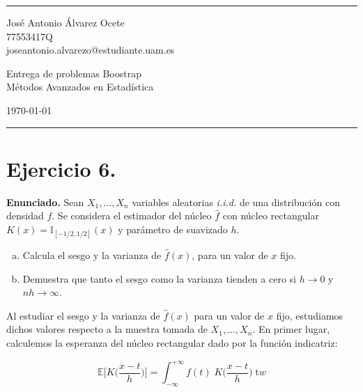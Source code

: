 \documentclass[a4paper]{article}
\newcommand{\E}{\mathbb{E}}
\newcommand{\I}{\mathbb{I}}
\begin{document}
	

\fancyhead[C]{}
\hrule \medskip %
\begin{minipage}{0.295\textwidth} 
	\raggedright
	\footnotesize
	José Antonio Álvarez Ocete \hfill\\   
	77553417Q \hfill\\
	joseantonio.alvarezo@estudiante.uam.es
\end{minipage}
\begin{minipage}{0.4\textwidth} 
	\centering 
	\large 
	Entrega de problemas Boostrap\\ 
	\normalsize 
	Métodos Avanzados en Estadística\\ 
\end{minipage}
\begin{minipage}{0.295\textwidth} 
	\raggedleft
	\today\hfill\\
\end{minipage}
\medskip\hrule 
\bigskip


\section*{Ejercicio 6.}

\textbf{Enunciado.} Sean $X_1, \ldots, X_n$ variables aleatorias \emph{i.i.d.} de una distribución con densidad $f$. Se considera el estimador del núcleo $\hat f$ con núcleo rectangular $K(x) = \I_{[-1/2,1/2]}(x)$ y parámetro de suavizado $h$.

\begin{enumerate}[a)]
	\item Calcula el sesgo y la varianza de $\hat f(x)$, para un valor de $x$ fijo.
	
	\item Demuestra que tanto el sesgo como la varianza tienden a cero si $h \rightarrow 0$ y $nh \rightarrow \infty$.
\end{enumerate}

Al estudiar el sesgo y la varianza de $\hat f(x)$ para un valor de $x$ fijo, estudiamos dichos valores respecto a la muestra tomada de  $X_1, \ldots, X_n$. En primer lugar, calculemos la esperanza del núcleo rectangular dado por la función indicatriz:

\[
	\E \bigg[ K\bigg(\frac{x - t}{h}\bigg) \bigg] = \int_{-\infty}^{+\infty} f(t) \; K\bigg(\frac{x - t}{h}\bigg) \; \text{t}w 
\]
\end{document}
